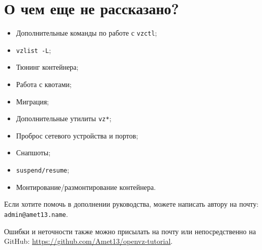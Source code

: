 \section{О чем еще не рассказано?}

\begin{itemize}
    \item Дополнительные команды по работе с \texttt{vzctl};
    \item \texttt{vzlist -L};
    \item Тюнинг контейнера;
    \item Работа с квотами;
    \item Миграция;
    \item Дополнительные утилиты \texttt{vz*};
    \item Проброс сетевого устройства и портов;
    \item Снапшоты;
    \item \texttt{suspend/resume};
    \item Монтирование/размонтирование контейнера.
\end{itemize}

Если хотите помочь в дополнении руководства, можете написать автору на почту: \texttt{admin@amet13.name}.

Ошибки и неточности также можно присылать на почту или непосредственно на GitHub: \url{https://github.com/Amet13/openvz-tutorial}.

\clearpage
